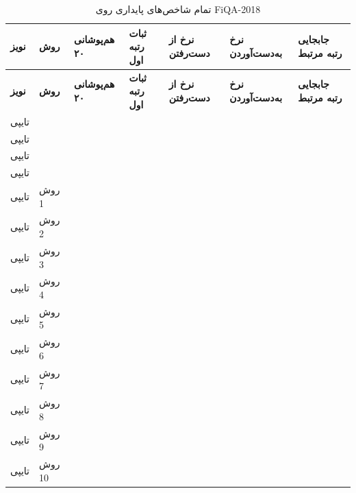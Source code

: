 \documentclass[a4paper,12pt]{article}
\begin{document}
\begin{landscape}
\scriptsize
\begin{longtable}{|C{2cm}|C{2.5cm}|C{2.4cm}|C{2.4cm}|C{2.4cm}|C{2.5cm}|C{2.7cm}|}
\caption{تمام شاخص‌های پایداری روی FiQA-2018}\label{tab:fiqa-full-robustness}\\
\hline
\textbf{نویز} & \textbf{روش} & \textbf{هم‌پوشانی ۲۰} & \textbf{ثبات رتبه اول} & \textbf{نرخ از دست‌رفتن} & \textbf{نرخ به‌دست‌آوردن} & \textbf{جابجایی رتبه مرتبط} \\
\hline
\endfirsthead
\hline
\textbf{نویز} & \textbf{روش} & \textbf{هم‌پوشانی ۲۰} & \textbf{ثبات رتبه اول} & \textbf{نرخ از دست‌رفتن} & \textbf{نرخ به‌دست‌آوردن} & \textbf{جابجایی رتبه مرتبط} \\
\hline
\endhead
تایپی &  &  &  &  &  &  \\
\hline
تایپی &  &  &  &  &  &  \\
\hline
تایپی &  &  &  &  &  &  \\
\hline
تایپی &  &  &  &  &  &  \\
\hline
تایپی & روش 1 &  &  &  &  &  \\
\hline
تایپی & روش 2 &  &  &  &  &  \\
\hline
تایپی & روش 3 &  &  &  &  &  \\
\hline
تایپی & روش 4 &  &  &  &  &  \\
\hline
تایپی & روش 5 &  &  &  &  &  \\
\hline
تایپی & روش 6 &  &  &  &  &  \\
\hline
تایپی & روش 7 &  &  &  &  &  \\
\hline
تایپی & روش 8 &  &  &  &  &  \\
\hline
تایپی & روش 9 &  &  &  &  &  \\
\hline
تایپی & روش 10 &  &  &  &  &  \\

\end{longtable}
\end{landscape}
\end{document}
